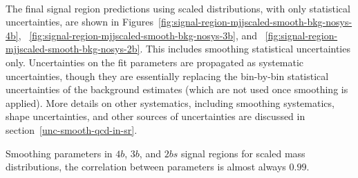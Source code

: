 \paragraph{}
The final signal region predictions using scaled \mtwoJ distributions, with only statistical uncertainties, are shown in Figures~\ref{fig:signal-region-mjjscaled-smooth-bkg-nosys-4b}, ~\ref{fig:signal-region-mjjscaled-smooth-bkg-nosys-3b}, and ~\ref{fig:signal-region-mjjscaled-smooth-bkg-nosys-2b}. 
This includes smoothing statistical uncertainties only. 
Uncertainties on the fit parameters are propagated as systematic uncertainties, though they are essentially replacing the bin-by-bin statistical uncertainties of the background estimates (which are not used once smoothing is applied).
More details on other systematics, including smoothing systematics, shape uncertainties, and other sources of uncertainties are discussed in section~\ref{unc-smooth-qcd-in-sr}.

\begin{table}[htb!]
\begin{center}
\caption{Smoothing parameters in $4b$, $3b$, and $2bs$ signal regions for scaled mass distributions, the correlation between parameters is almost always $0.99$.}

\label{tab:smoothparams_pole}
\end{center}
\end{table}

